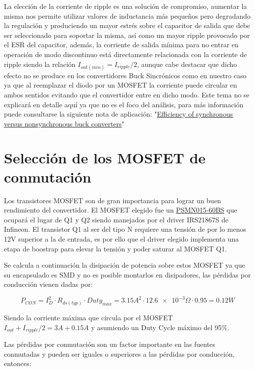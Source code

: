 \documentclass[12pt]{report}
\begin{document}
	La elección de la corriente de ripple es una solución de compromiso, aumentar la misma nos permite utilizar valores de inductancia más pequeños pero degradando la regulación y produciendo un mayor estrés sobre el capacitor de salida que debe ser seleccionado para soportar la misma, así como un mayor ripple provocado por el ESR del capacitor, además, la corriente de salida mínima para no entrar en operación de modo discontinuo está directamente relacionada con la corriente de ripple siendo la relación $I_{out(min)} = I_{ripple}/2$, aunque cabe destacar que dicho efecto no se produce en los convertidores Buck Sincrónicos como en nuestro caso ya que al reemplazar el diodo por un MOSFET la corriente puede circular en ambos sentidos evitando que el convertidor entre en dicho modo. Este tema no se explicará en detalle aquí ya que no es el foco del análisis, para más información puede consultarse la siguiente nota de aplicación: "\href{http://www.ti.com/lit/an/slyt358/slyt358.pdf}{Efficiency of synchronous versus
		nonsynchronous buck converters}"
	
\section{Selección de los MOSFET de conmutación}
	
	Los transistores MOSFET son de gran importancia para lograr un buen rendimiento del convertidor. El MOSFET elegido fue un \href{https://assets.nexperia.com/documents/data-sheet/PSMN015-60BS.pdf}{PSMN015-60BS} que ocupará el lugar de Q1 y Q2 siendo manejados por el driver IRS21867S de Infineon. El transistor Q1 al ser del tipo N requiere una tensión de por lo menos 12V superior a la de entrada, es por ello que el driver elegido implementa una etapa de boostrap para elevar la tensión y poder saturar al MOSFET Q1.
	
	Se calcula a continuación la disipación de potencia sobre estos MOSFET ya que su encapsulado es SMD y no es posible montarlos en disipadores, las pérdidas por conducción vienen dadas por:
	
	\begin{equation}
	P_{CON} = I_D^2 \cdot R_{ds(typ)} \cdot Duty_{max} =  3.15A^2 \cdot \num{12.6e-3}\Omega \cdot 0.95 = 0.12W
	\end{equation}
	
	Siendo la corriente máxima que circula por el MOSFET $I_{out} + I_{ripple}/2 = 3A + 0.15A$ y asumiendo un Duty Cycle máximo del 95\%.
	
	Las pérdidas por conmutación son un factor importante en las fuentes conmutadas y pueden ser iguales o superiores a las pérdidas por conducción, entonces:
	
\end{document}
